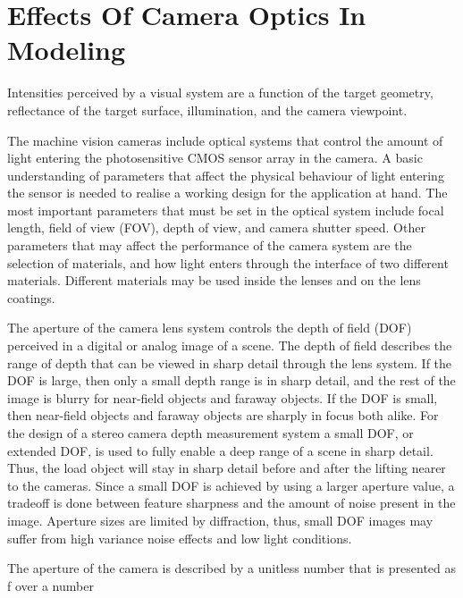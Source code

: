 \documentclass[12pt,a4paper,oneside,pdftex]{report}
\begin{document}
\section{Effects Of Camera Optics In Modeling}
\label{section:effects_of_camera_optics_in_modeling}


Intensities perceived by a visual system are a function of the target geometry, reflectance of the target surface, illumination, and the camera viewpoint.

The machine vision cameras include optical systems that control the amount of light entering the photosensitive CMOS sensor array in the camera. A basic understanding of parameters that affect the physical behaviour of light entering the sensor is needed to realise a working design for the application at hand. The most important parameters that must be set in the optical system include focal length, field of view (FOV), depth of view, and camera shutter speed. Other parameters that may affect the performance of the camera system are the selection of materials, and how light enters through the interface of two different materials. Different materials may be used inside the lenses and on the lens coatings. 

The aperture of the camera lens system controls the depth of field (DOF) perceived in a digital or analog image of a scene. The depth of field describes the range of depth that can be viewed in sharp detail through the lens system. If the DOF is large, then only a small depth range is in sharp detail, and the rest of the image is blurry for near-field objects and faraway objects. If the DOF is small, then near-field objects and faraway objects are sharply in focus both alike. For the design of a stereo camera depth measurement system a small DOF, or extended DOF, is used to fully enable a deep range of a scene in sharp detail. Thus, the load object will stay in sharp detail before and after the lifting nearer to the cameras. Since a small DOF is achieved by using a larger aperture value, a tradeoff is done between feature sharpness and the amount of noise present in the image. Aperture sizes are limited by diffraction, thus, small DOF images may suffer from high variance noise effects and low light conditions.

The aperture of the camera is described by a unitless number that is presented as f over a number
\end{document}
